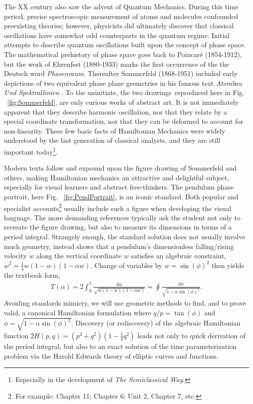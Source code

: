\documentclass[nofootinbib,preprint]{revtex4-1}
\begin{document}
The XX century also saw the advent of Quantum Mechanics. During this time period, precise spectroscopic 
measurement of atoms and molecules confounded preexisting theories; however, physicists did ultimately 
discover that classical oscillations have 
somewhat odd counterparts in the quantum regime. Initial attempts to describe quantum oscillations 
built upon the concept of phase space. The mathematical prehistory of phase space goes back to Poincar\'{e} 
(1854-1912), but the work of Ehrenfest (1880-1933) marks the first occurrence of the the Deutsch 
word \textit{Phasenraum}\cite{NOLTE2010}. Thereafter Sommerfeld (1868-1951) included early depictions 
of two equivalent phase plane geometries in his famous text \textit{Atombau Und Spektrallinien} \cite{SOMMERFELD1921}. 
To the uninitiate, the two drawings\, reproduced here in Fig. ~\ref{fig:Sommerfeld}, 
are only curious works of abstract art. It is not immediately apparent that they describe harmonic 
oscillation, nor that they relate by a special coordinate transformation, nor that they can be deformed 
to account for non-linearity. These few basic facts of Hamiltonian Mechanics were widely understood by 
the last generation of classical analysts, and they are still important 
today\footnote{Especially in the development of \textit{The Semiclassical Way}\cite{HELLER2018}.}. 

Modern texts follow and expound upon the figure drawing of Sommerfeld and others, making Hamiltonian
mechanics an attractive and delightful subject, especially for visual learners and abstract 
free-thinkers. The pendulum phase portrait, here Fig. ~\ref{fig:PendPortrait}, is an iconic standard. 
Both popular and specialist accounts\footnote{For example: \cite{STROGATZ2019} Chapter 11; \cite{STROGATZ2018} 
Chapter 6; \cite{HARTER2019} Unit 2, Chapter 7, etc.} usually include such a figure when developing the 
visual language. The more demanding references typically ask the student not only to recreate the figure 
drawing, but also to measure its dimensions in terms of a period integral. Strangely enough, the standard 
solution does not usually involve much geometry, instead shows that a pendulum's dimensionless falling/rising 
velocity $\dot{w}$ along the vertical coordinate $w$ satisfies an algebraic constraint, 
$\dot{w}^2=\frac{1}{4}w(1-w)(1-\alpha w)$. Change of variables by $w=\sin(\phi)^2$ then yields the 
textbook form, 
\begin{eqnarray}
T(\alpha) = 2 \int_{0}^{1} \frac{ dw}{\sqrt{w(1-w)(1-\alpha w)}} =
\oint \frac{ d\phi}{\sqrt{1-\alpha \sin(\phi)^2}} . \nonumber
\end{eqnarray}
Avoiding standards mimicry, we will use geometric methods to find, and to prove valid, a canonical 
Hamiltonian formulation where $q/p=\tan(\phi)$ and $\dot{\phi}=\sqrt{1-\alpha\sin(\phi)^2 }$. 
Discovery (or rediscovery) of the algebraic Hamiltonian function $2H(p,q)=(p^2+q^2)(1-\frac{1}{4}q^2)$ 
leads not only to quick derivation of the period integral, but also to an exact solution of the time 
parameterization problem via the Harold Edwards theory of elliptic curves and
functions.  
\end{document}
